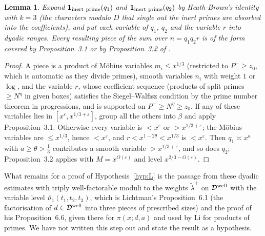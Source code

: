 \documentclass[11pt]{amsart}
\newtheorem{lemma}[theorem]{Lemma}
\theoremstyle{remark}
\newcommand{\e}{\varepsilon}
\begin{document}
\begin{lemma}\label{lem:pieces}
Expand $\mathbf 1_{\rm inert\ prime}(q_1)$ and $\mathbf 1_{\rm inert\ prime}(q_2)$ by Heath-Brown's identity with $k=3$ (the characters modulo $D$ that single out the inert primes are absorbed into the coefficients), and put each variable of $q_1$, $q_2$ and the variable $r$ into dyadic ranges. Every resulting piece of the sum over $n=q_1q_2r$ is of the form covered by Proposition~3.1 or by Proposition~3.2 of \cite{Lichtman}.
\end{lemma}
\begin{proof}
A piece is a product of M\"obius variables $m_i\le x^{1/3}$ (restricted to $P^-\ge z_0$, which is automatic as they divide primes), smooth variables $n_i$ with weight $1$ or $\log$, and the variable $r$, whose coefficient sequence (products of split primes $\ge N^\eta$ in given boxes) satisfies the Siegel--Walfisz condition by the prime number theorem in progressions, and is supported on $P^-\ge N^\eta\ge z_0$. If any of these variables lies in $[x^\e,x^{1/3+\e}]$, group all the others into $\beta$ and apply Proposition~3.1. Otherwise every variable is $<x^\e$ or $>x^{1/3+\e}$; the M\"obius variables are $\le x^{1/3}$, hence $<x^\e$, and $r<x^{1-2\theta}<x^{1/3}$ is $<x^\e$. Then $q_1\asymp x^{a}$ with $a\ge\theta>\frac13$ contributes a smooth variable $>x^{1/3+\e}$, and so does $q_2$; Proposition~3.2 applies with $M=x^{O(\e)}$ and level $x^{2/3-O(\e)}$.
\end{proof}
What remains for a proof of Hypothesis~\ref{hyp:L} is the passage from these dyadic estimates with triply well-factorable moduli to the weights $\tilde\lambda^+$ on $\mathcal D^{\rm well}$ with the variable level $\vartheta_1(t_1,t_2,t_3)$, which is Lichtman's Proposition~6.1 (the factorisation of $d\in\mathcal D^{\rm well}$ into three pieces of prescribed sizes) and the proof of his Proposition~6.6, given there for $\pi(x;d,a)$ and used by Li for products of primes. We have not written this step out and state the result as a hypothesis.
\end{document}
